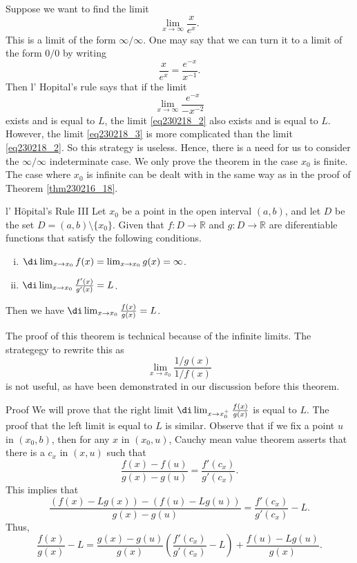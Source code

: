 \begin{example}{}
Suppose we want to find the limit
\begin{equation}\label{eq230218_2}\lim_{x\rightarrow \infty}\frac{x}{e^x}.\end{equation}
This is a limit of the form $\infty/\infty$. One may say that we can turn it to a limit of the form $0/0$ by writing
\[\frac{x}{e^x}=\frac{e^{-x}}{x^{-1}}.\]
Then l' H$\hat{\text{o}}$pital's rule says that if the limit
\begin{equation}\label{eq230218_3}\lim_{x\to\infty}\frac{e^{-x}}{- x^{-2}}\end{equation} exists and is equal to $L$, the limit \eqref{eq230218_2} also exists and is equal to $L$. However, the limit \eqref{eq230218_3} is   more complicated than the limit \eqref{eq230218_2}. So this strategy is useless.
Hence, there is a need for us to consider the $\infty/\infty$ indeterminate case. We only  prove the theorem in the case $x_0$ is finite. The case where $x_0$ is infinite can be dealt with in the same way as in the proof of Theorem \ref{thm230216_18}.
 

\begin{theorem}[label=thm230216_19]{l' H$\hat{\text{o}}$pital's Rule III}
Let $x_0$ be a point in the open interval $(a, b)$, and let  $D$ be the set $D=(a,b)\setminus\{x_0\}$. Given that $f:D\to\mathbb{R}$ and $g:D\to\mathbb{R}$ are diferentiable  functions that satisfy the following conditions.
\begin{enumerate}[(i)]
\item $\di\lim_{x\rightarrow x_0}f(x)=\lim_{x\rightarrow x_0}g(x)=\infty$.
\item  $\di\lim_{x\rightarrow x_0}\frac{f'(x)}{g'(x)}=L$.

\end{enumerate}
Then  we have $\di \lim_{x\rightarrow x_0}\frac{f(x)}{g(x)}=L$.
\end{theorem}
 The proof of this theorem is technical because of the infinite limits. The strategegy to rewrite this as 
\[\lim_{x\to x_0}\frac{1/g(x)}{1/f(x)}\] is not useful, as have been demonstrated in our discussion before this theorem.
\begin{myproof}{Proof}
We will prove that  the right limit $\di \lim_{x\rightarrow x_0^+}\frac{f(x)}{g(x)}$ is equal to $L$. The proof that the left limit is equal to $L$ is similar.  
Observe that if we fix a point $u$ in $(x_0, b)$, then for any $x$ in $(x_0, u)$, Cauchy mean value theorem asserts that there is a $c_x$ in $(x, u)$ such that 
\[\frac{f(x)-f(u)}{g(x)-g(u)}=\frac{f'(c_x)}{g'(c_x)}.\]\bp
This implies that
\[\frac{(f(x)-Lg(x))-(f(u)-Lg(u))}{g(x)-g(u)}=\frac{f'(c_x)}{g'(c_x)}-L.\]Thus,
\begin{equation}\label{eq230217_2}\frac{f(x)}{g(x)}-L=\frac{g(x)-g(u)}{g(x)}\left(\frac{f'(c_x)}{g'(c_x)}-L\right)+\frac{f(u)-Lg(u)}{g(x)}.\end{equation}



\end{myproof}
\end{example}
